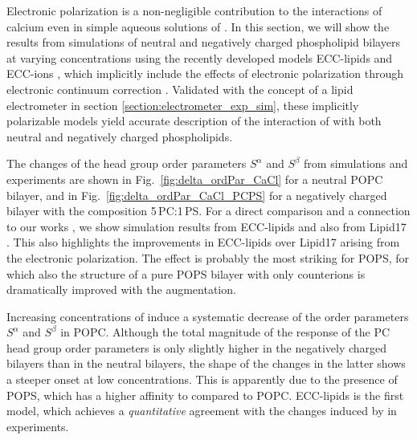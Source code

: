 \documentclass[journal=jpcbfk,manuscript=article]{achemso}
\begin{document}
Electronic polarization is a non-negligible contribution to the interactions of calcium even in simple aqueous solutions of  \citep{martinek17, kohagen16, Pluharova2014}. 
In this section,
we will show the results from simulations of neutral and negatively charged phospholipid bilayers at varying  concentrations
using the recently developed models ECC-lipids and ECC-ions \citep{melcr18, martinek17}, 
which implicitly include the effects of electronic polarization through electronic continuum correction \citep{leontyev11}. 
Validated with the concept of a lipid electrometer in section \ref{section:electrometer_exp_sim},
these implicitly polarizable models yield accurate description of 
the interaction of  with both neutral and negatively charged phospholipids. 

The changes of the head group order parameters $S^\alpha$ and $S^\beta$ from simulations and experiments 
are shown in Fig.~\ref{fig:delta_ordPar_CaCl} for a neutral POPC bilayer, 
and in Fig.~\ref{fig:delta_ordPar_CaCl_PCPS} for a negatively charged bilayer with the composition 5\,PC:1\,PS. 
For a direct comparison and a connection to our works \citep{catte16, nmrlipids_proj4},
we show simulation results from ECC-lipids and also from Lipid17 \citep{lipid17-future}. 
This also highlights the improvements in ECC-lipids over Lipid17 arising from the electronic polarization. 
The effect is probably the most striking for POPS, 
for which also the structure of a pure POPS bilayer with only counterions is dramatically improved with the augmentation. 


Increasing concentrations of  induce a systematic decrease of the order parameters $S^\alpha$ and $S^\beta$ in POPC. 
Although the total magnitude of the response of the PC head group order parameters 
is only slightly higher in the negatively charged bilayers than in the neutral bilayers, 
the shape of the changes in the latter shows a steeper onset at low concentrations. 
This is apparently due to the presence of POPS, 
which has a higher affinity to  compared to POPC. 
ECC-lipids is the first model,
which achieves a \emph{quantitative} agreement with the changes induced by  in experiments. 
\end{document}
